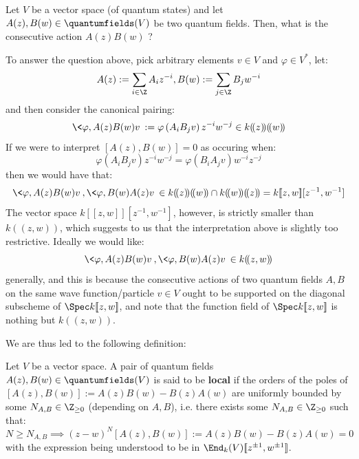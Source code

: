        \begin{question}
            Let $V$ be a vector space (of quantum states) and let $A(z), B(w) \in \quantumfields(V)$ be two quantum fields. Then, what is the consecutive action $A(z) B(w)$ ?
        \end{question}
        To answer the question above, pick arbitrary elements $v \in V$ and $\varphi \in V^*$, let:
            $$A(z) := \sum_{i \in \Z} A_i z^{-i}, B(w) := \sum_{j \in \Z} B_j w^{-i}$$
        and then consider the canonical pairing:
            $$\< \varphi , A(z) B(w) v \> := \varphi\left( A_i B_j v \right) z^{-i} w^{-j} \in k(\!(z)\!)(\!(w)\!)$$
        If we were to interpret $[A(z), B(w)] = 0$ as occuring when:
            $$\varphi\left( A_i B_j v \right)z^{-i} w^{-j} = \varphi\left( B_i A_j v \right)w^{-i} z^{-j}$$
        then we would have that:
            $$\< \varphi , A(z) B(w) v \>, \< \varphi , B(w) A(z) v \> \in k(\!(z)\!)(\!(w)\!) \cap k(\!(w)\!)(\!(z)\!) = k[\![z, w]\!][z^{-1}, w^{-1}]$$
        The vector space $k[\![z, w]\!][z^{-1}, w^{-1}]$, however, is strictly smaller than $k(\!(z, w)\!)$, which suggests to us that the interpretation above is slightly too restrictive. Ideally we would like:
            $$\< \varphi , A(z) B(w) v \>, \< \varphi , B(w) A(z) v \> \in k(\!(z, w)\!)$$
        generally, and this is because the consecutive actions of two quantum fields $A, B$ on the same wave function/particle $v \in V$ ought to be supported on the diagonal subscheme of $\Spec k[\![z, w]\!]$, and note that the function field of $\Spec k[\![z, w]\!]$ is nothing but $k(\!(z, w)\!)$.
        
        We are thus led to the following definition:
        \begin{definition}[Locality] \label{def: locality}
            Let $V$ be a vector space. A pair of quantum fields $A(z), B(w) \in \quantumfields(V)$ is said to be \textbf{local} if the orders of the poles of $[A(z), B(w)] := A(z)B(w) - B(z)A(w)$ are uniformly bounded by some $N_{A, B} \in \Z_{\geq 0}$ (depending on $A, B$), i.e. there exists some $N_{A, B} \in \Z_{\geq 0}$ such that:
                $$N \geq N_{A, B} \implies (z - w)^N [A(z), B(w)] := A(z)B(w) - B(z)A(w) = 0$$
            with the expression being understood to be in $\End_k(V)[\![z^{\pm 1}, w^{\pm 1}]\!]$.
        \end{definition}